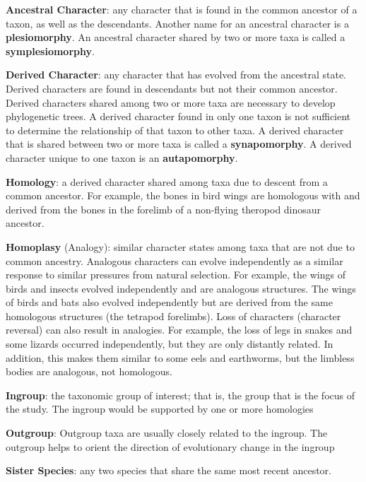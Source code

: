 \documentclass[letterpaper]{tufte-handout}
\begin{document}
\noindent\textbf{Ancestral Character}: any character that is found in the common ancestor of a taxon, as well as the descendants.  Another name for an ancestral character is a \textbf{plesiomorphy}. An ancestral character shared by two or more taxa is called a \textbf{symplesiomorphy}.

\noindent\textbf{Derived Character}: any character that has evolved from the ancestral state. Derived characters are found in descendants but not their common ancestor. Derived characters shared among two or more taxa are necessary to develop phylogenetic trees.  A derived character found in only one taxon is not sufficient to determine the relationship of that taxon to other taxa.  A derived character that is shared between two or more taxa is called a \textbf{synapomorphy}.  A derived character unique to one taxon is an \textbf{autapomorphy}.

\noindent\textbf{Homology}: a derived character shared among taxa due to descent from a common ancestor. For example, the bones in bird wings are homologous with and derived from the bones in the forelimb of a non-flying theropod dinosaur ancestor.

\noindent\textbf{Homoplasy} (Analogy): similar character states among taxa that are not due to common ancestry. Analogous characters can evolve independently as a similar response to similar pressures from natural selection. For example, the wings of birds and insects evolved independently and are analogous structures.  The wings of birds and bats also evolved independently but are derived from the same homologous structures (the tetrapod forelimbs). Loss of characters (character reversal) can also result in analogies. For example, the loss of legs in snakes and some lizards occurred independently, but they are only distantly related. In addition, this makes them similar to some eels and earthworms, but the limbless bodies are analogous, not homologous. 

\newpage

\noindent\textbf{Ingroup}: the taxonomic group of interest; that is, the group that is the focus of the study. The ingroup would be supported by one or more homologies

\noindent\textbf{Outgroup}: Outgroup taxa are usually closely related to the ingroup.  The outgroup helps to orient the direction of evolutionary change in the ingroup

\noindent\textbf{Sister Species}: any two species that share the same most recent ancestor. 
\end{document}
